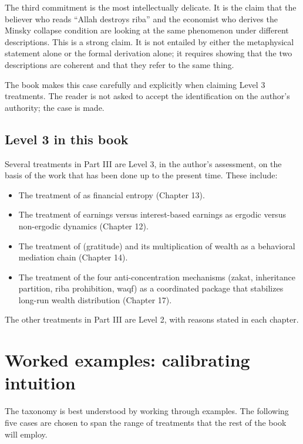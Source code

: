 The third commitment is the most intellectually delicate. It is the
claim that the believer who reads ``Allah destroys riba'' and the
economist who derives the Minsky collapse condition are looking at
the same phenomenon under different descriptions. This is a strong
claim. It is not entailed by either the metaphysical statement alone
or the formal derivation alone; it requires showing that the two
descriptions are coherent and that they refer to the same thing.

The book makes this case carefully and explicitly when claiming
Level 3 treatments. The reader is not asked to accept the
identification on the author's authority; the case is made.

\subsection{Level 3 in this book}

Several treatments in Part III are Level 3, in the author's
assessment, on the basis of the work that has been done up to the
present time. These include:

\begin{itemize}[leftmargin=2em]
    \item The treatment of  as financial entropy
    (Chapter 13).
    \item The treatment of  earnings versus
    interest-based earnings as ergodic versus non-ergodic dynamics
    (Chapter 12).
    \item The treatment of  (gratitude) and
    its multiplication of wealth as a behavioral mediation chain
    (Chapter 14).
    \item The treatment of the four anti-concentration mechanisms
    (zakat, inheritance partition, riba prohibition, waqf) as a
    coordinated package that stabilizes long-run wealth distribution
    (Chapter 17).
\end{itemize}

The other treatments in Part III are Level 2, with reasons stated in
each chapter.

\section{Worked examples: calibrating intuition}
\label{sec:worked-examples}

The taxonomy is best understood by working through examples. The
following five cases are chosen to span the range of treatments that
the rest of the book will employ.

